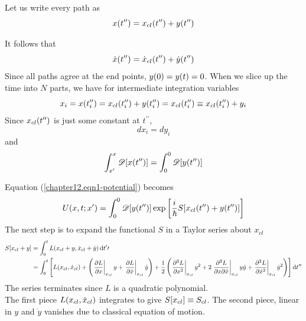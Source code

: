 	Let us write every path as
	\begin{equation}
		x\qty(t^{\prime\prime}) =  x_{cl}\qty(t^{\prime\prime}) + y(t^{\prime\prime})
		\label{chapter12.eqn2-potential}
	\end{equation}
	
	It follows that
	\begin{equation}
		\dot{x}\qty(t^{\prime\prime}) =  \dot{x}_{cl}\qty(t^{\prime\prime}) + \dot{y}(t^{\prime\prime})
		\label{chapter12.eqn3-potential}
	\end{equation}
	Since all paths agree at the end points, $y\qty(0) = y(t) = 0$. When we slice up the time into $N$ parts, we have for intermediate integration variables
	\begin{equation}
		x_i = x\qty(t^{\prime\prime}_i) = x_{cl}\qty(t^{\prime\prime}_i) + y\qty(t^{\prime\prime}_i)  = x_{cl}\qty(t^{\prime\prime}_i) \equiv x_{cl}\qty(t^{\prime\prime}_i) + y_i
	\end{equation}
	Since $x_{cl}\qty(t^{\prime\prime})$ is just some constant at $t^{\prime\prime}$,
	\begin{equation}
		dx_i = dy_i
	\end{equation}
	and 
	\begin{equation}
		\int_{x^\prime}^{x}  \mathcal{D}\qty[x\qty(t^{\prime\prime})] = \int_{0}^{0}  \mathcal{D}\qty[y\qty(t^{\prime\prime})]
		\label{chapter12.eqn4-potential}
	\end{equation}
	
	Equation (\ref{chapter12.eqn1-potential}) becomes
	\begin{equation}
		U\qty(x,t;x^\prime) = \int_{0}^{0} \mathcal{D}\qty[y\qty(t^{\prime\prime})]  \exp\qty[\frac{{i\mkern1mu}}{\hbar} S\qty[x_{cl}\qty(t^{\prime\prime})  +  y\qty(t^{\prime\prime})]]
		\label{chapter12.eqn5-potential}
	\end{equation}
	The next step is to expand the functional $S$ in a Taylor series about $x_{cl}$
	\begin{align*}
		S\qty[x_{cl} + y] 
		&= \int_{0}^{t} L\qty(x_{cl} + y, \dot{x}_{cl} + \dot{y}) \dd{t^\prime\prime} \\
		&= \int_{0}^{t} \left[
		L(x_{cl}, \dot{x}_{cl})  + \left(\eval{\pdv{L}{x}}_{x_{cl}} y + \eval{\pdv{L}{\dot{x}}}_{x_{cl}} \dot{y}\right)
		+ \frac{1}{2} \left(
		\eval{\pdv[2]{L}{x}}_{x_{cl}} y^2 
		+ 2 \eval{\pdv[2]{L}{x}{\dot{x}}}_{x_{cl}} y\dot{y} 
		+ \eval{\pdv[2]{L}{\dot{x}}}_{x_{cl}} \dot{y}^2		\right)
		\right] \dd{t^{\prime\prime}}
		\label{chapter12.eqn6-potential}
	\end{align*}
	The series terminates since $L$ is a quadratic polynomial.\\
	The first piece $L\qty(x_{cl}, \dot{x}_{cl})$ integrates to give $S\qty[x_{cl}] \equiv S_{cl}$. The second piece, linear in $y$ and $\dot{y}$ vanishes due to classical equation of motion.\\
		
